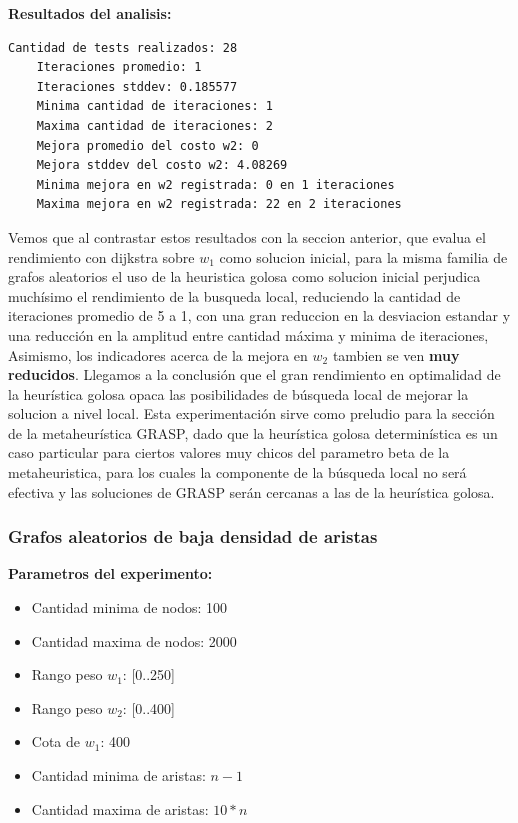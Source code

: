 \textbf{Resultados del analisis:}
\begin{lstlisting}[frame=single]
	Cantidad de tests realizados: 28
	Iteraciones promedio: 1
	Iteraciones stddev: 0.185577
	Minima cantidad de iteraciones: 1
	Maxima cantidad de iteraciones: 2
	Mejora promedio del costo w2: 0
	Mejora stddev del costo w2: 4.08269
	Minima mejora en w2 registrada: 0 en 1 iteraciones
	Maxima mejora en w2 registrada: 22 en 2 iteraciones
\end{lstlisting}

Vemos que al contrastar estos resultados con la seccion anterior, que evalua el rendimiento con dijkstra sobre $w_1$ como solucion inicial, para la misma familia de grafos aleatorios el uso de la heuristica golosa como solucion inicial perjudica much\'isimo el rendimiento de la busqueda local, reduciendo la cantidad de iteraciones promedio de 5 a 1, con una gran reduccion en la desviacion estandar y una reducci\'on en la amplitud entre cantidad m\'axima y minima de iteraciones, Asimismo, los indicadores acerca de la mejora en $w_2$ tambien se ven \textbf{muy reducidos}. Llegamos a la conclusi\'on que el gran rendimiento en optimalidad de la heur\'istica golosa opaca las posibilidades de b\'usqueda local de mejorar la solucion a nivel local. Esta experimentaci\'on sirve como preludio para la secci\'on de la metaheur\'istica GRASP, dado que la heur\'istica golosa determin\'istica es un caso particular para ciertos valores muy chicos del parametro beta de la metaheuristica, para los cuales la componente de la b\'usqueda local no ser\'a efectiva y las soluciones de GRASP ser\'an cercanas a las de la heur\'istica golosa.

\subsubsection{Grafos aleatorios de baja densidad de aristas}
\textbf{Parametros del experimento:}
\begin{itemize}
	\item Cantidad minima de nodos: 100
	\item Cantidad maxima de nodos: 2000
	\item Rango peso $w_1$: [0..250]
	\item Rango peso $w_2$: [0..400]
	\item Cota de $w_1$: 400
	\item Cantidad minima de aristas: $n-1$
	\item Cantidad maxima de aristas: $10*n$
\end{itemize}

